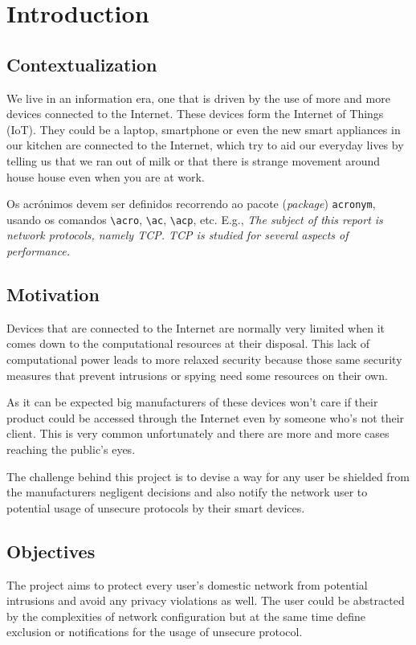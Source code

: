 \chapter{Introduction}
\label{chap:intro}

\section{Contextualization}
\label{sec:context} %
We live in an information era, one that is driven by the use of more and more
devices connected to the Internet. These devices form the Internet of Things
(IoT). They could be a laptop, smartphone or even the new smart appliances in
our kitchen are connected to the Internet, which try to aid our everyday lives
by telling us that we ran out of milk or that there is strange movement around
house house even when you are at work.

Os acrónimos devem ser definidos recorrendo ao pacote (\emph{package}) \texttt{acronym}, usando os comandos \texttt{\textbackslash acro}, \texttt{\textbackslash ac}, \texttt{\textbackslash acp}, etc. E.g., \emph{The subject of this report is network protocols, namely \ac{TCP}.  \ac{TCP} is studied for several aspects of performance.}


\section{Motivation}
\label{sec:mot}
Devices that are connected to the Internet are normally very limited when it
comes down to the computational resources at their disposal. This lack of
computational power leads to more relaxed security because those same security
measures that prevent intrusions or spying need some resources on their own.

As it can be expected big manufacturers of these devices won't care if their
product could be accessed through the Internet even by someone who's not their
client. This is very common unfortunately and there are more and more cases
reaching the public's eyes.

The challenge behind this project is to devise a way for any user be shielded
from the manufacturers negligent decisions and also notify the network user to
potential usage of unsecure protocols by their smart devices.

\section{Objectives}
\label{sec:obj}
The project aims to protect every user's domestic network from potential
intrusions and avoid any privacy violations as well. The user could be
abstracted by the complexities of network configuration but at the same time
define exclusion or notifications for the usage of unsecure protocol.

